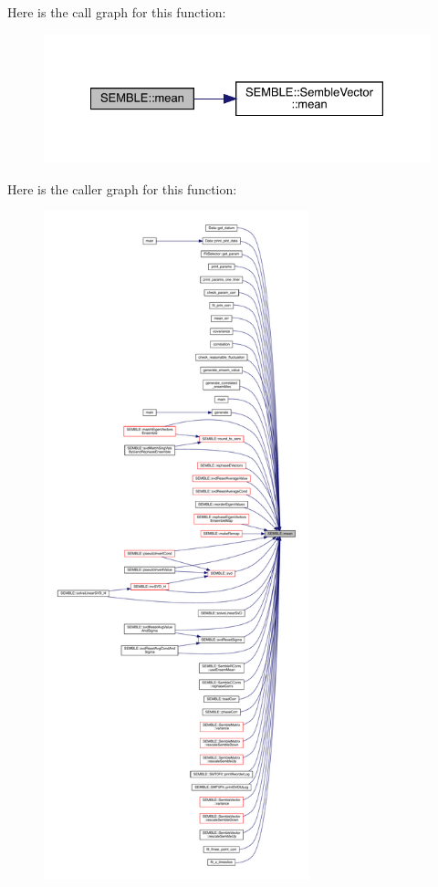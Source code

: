 Here is the call graph for this function\+:
\nopagebreak
\begin{figure}[H]
\begin{center}
\leavevmode
\includegraphics[width=328pt]{d7/dfd/namespaceSEMBLE_a5e097207a44d3902030de8bed204b0b8_cgraph}
\end{center}
\end{figure}
Here is the caller graph for this function\+:
\nopagebreak
\begin{figure}[H]
\begin{center}
\leavevmode
\includegraphics[height=550pt]{d7/dfd/namespaceSEMBLE_a5e097207a44d3902030de8bed204b0b8_icgraph}
\end{center}
\end{figure}
\mbox{\label{namespaceSEMBLE_a350af9bd145f4f0271cad126a631eb4c}} 

